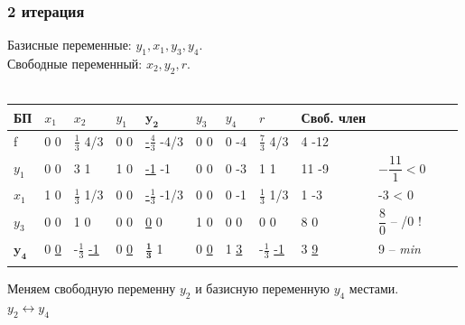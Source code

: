 \documentclass[14pt,a4paper,fleqn]{extarticle}
\begin{document}
\subsubsection*{2 итерация}
Базисные переменные: $y_1, x_1, y_3, y_4$.\\
Свободные переменный: $x_2, y_2, r$.\\\\
\begin{tabularx}{\textwidth}{|p{1cm}|p{1cm}|p{1cm}|p{1cm}V{6}p{1cm}V{6}p{1cm}|p{1cm}|p{1cm}|p{1.2cm}|c}
	\hline
	БП & $x_1$ & $x_2$ & $y_1$ & $\boldsymbol{y_2}$ & $y_3$ & $y_4$ & $r$ & Своб. член & \\
	\hline
	
	f & 0 \scriptsize 0 & \small $\frac{1}{3}$ \tiny 4/3 & 0 \scriptsize 0 & \underline{\small -$\frac{4}{3}$} \tiny -4/3 & 0 \scriptsize 0 & 0 \scriptsize -4 & \small $\frac{7}{3}$ \tiny 4/3 & 4 \scriptsize -12 & \\
	
	\hline
	
	$y_1$ & 0 \scriptsize 0 & 3 \scriptsize 1 & 1 \scriptsize 0 & \underline{-1} \scriptsize -1 & 0 \scriptsize 0 & 0 \scriptsize -3 & 1 \scriptsize 1 & 11 \scriptsize -9 & $-\dfrac{11}{1} < 0$ \\
	
	\hline
	
	$x_1$ & 1 \scriptsize 0 & \small $\frac{1}{3}$ \scriptsize 1/3 & 0 \scriptsize 0 & \underline{\small -$\frac{1}{3}$} \tiny -1/3 & 0 \scriptsize 0 & 0 \scriptsize -1 & \small $\frac{1}{3}$ \scriptsize 1/3 & 1 \scriptsize -3 & -3 < 0 \\
	
	\hline
	$y_3$ & 0 \scriptsize 0 & 1 \scriptsize 0 & 0 \scriptsize 0 & \underline 0 \scriptsize 0 & 1 \scriptsize 0 & 0 \scriptsize 0 & 0 \scriptsize 0 & 8 \scriptsize 0 & $\dfrac{8}{0}$ -- /0 ! \\
	
	\Xhline{7\arrayrulewidth}
	$\boldsymbol{y_4}$ & 0 \underline{\scriptsize 0} & \small -$\frac{1}{3}$ \underline{\scriptsize -1} & 0 \underline{\scriptsize 0} & \small $\boldsymbol{\frac{1}{3}}$ \scriptsize 1 & 0 \underline{\scriptsize 0} & 1 \scriptsize \underline 3 & \small -$\frac{1}{3}$ \underline{\scriptsize -1} & 3 \underline{\scriptsize 9} & 9 -- \textit{min} \\
	\Xhline{6\arrayrulewidth}
\end{tabularx}
\newline\newline
Меняем свободную переменну $y_2$ и базисную переменную $y_4$ местами.\\
$y_2 \leftrightarrow y_4$
\newpage
\end{document}
